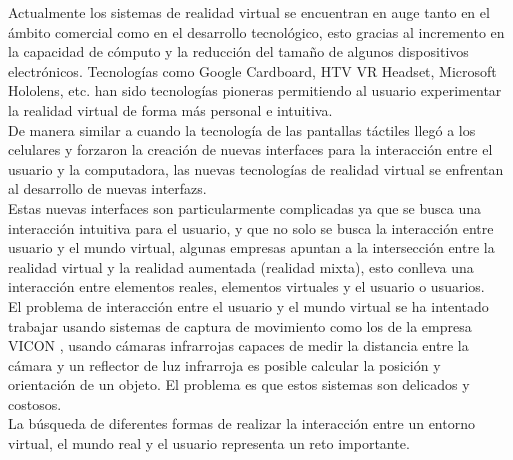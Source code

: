 Actualmente los sistemas de \gls{realidad virtual} se encuentran en auge tanto en el ámbito comercial como en el desarrollo tecnológico, esto gracias al incremento en la capacidad de cómputo y la reducción del tamaño de algunos dispositivos electrónicos. Tecnologías como Google Cardboard, HTV VR Headset, Microsoft Hololens, etc. han sido tecnologías pioneras permitiendo al usuario experimentar la realidad virtual de forma más personal e intuitiva.\\

De manera similar a cuando la tecnología de las pantallas táctiles llegó a los celulares y forzaron la creación de nuevas interfaces para la interacción entre el usuario y la computadora, las nuevas tecnologías de realidad virtual se enfrentan al desarrollo de nuevas \glspl{interfaz}.\\

Estas nuevas interfaces son particularmente complicadas ya que se busca una interacción intuitiva para el usuario, y que no solo se busca la interacción entre usuario y el mundo virtual, algunas empresas apuntan a la intersección entre la realidad virtual y la realidad aumentada (realidad mixta), esto conlleva una interacción entre elementos reales, elementos virtuales y el usuario o usuarios.\\

El problema de interacción entre el usuario y el mundo virtual se ha intentado trabajar usando sistemas de captura de movimiento como los de la empresa VICON \cite{vicon}, usando cámaras infrarrojas capaces de medir la distancia entre la cámara y un reflector de luz infrarroja es posible calcular la posición y orientación de un objeto. El problema es que estos sistemas son delicados y costosos.\\

La búsqueda de diferentes formas de realizar la interacción entre un entorno virtual, el mundo real y el usuario representa un reto importante.\\



